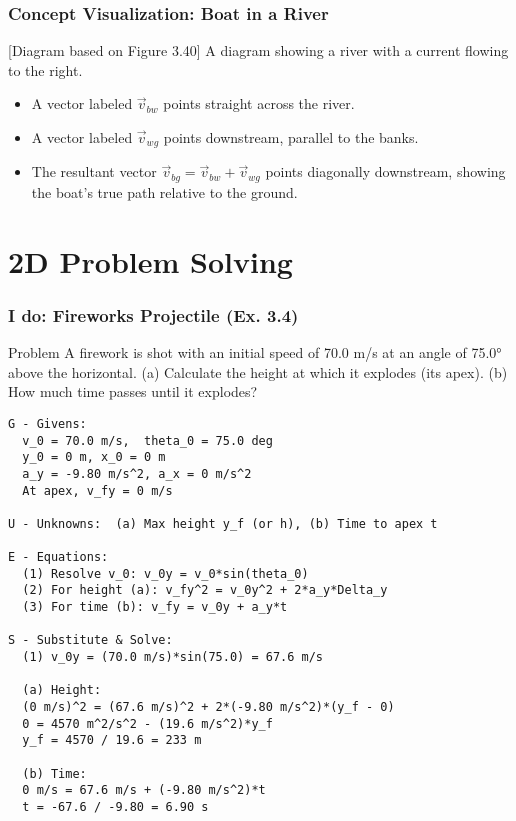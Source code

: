 \documentclass{beamer}
\begin{document}
\begin{frame}
\frametitle{Concept Visualization: Boat in a River}
\begin{alertblock}{[Diagram based on Figure 3.40]}
A diagram showing a river with a current flowing to the right.
\begin{itemize}
    \item A vector labeled $\vec{v}_{bw}$ points straight across the river.
    \item A vector labeled $\vec{v}_{wg}$ points downstream, parallel to the banks.
    \item The resultant vector $\vec{v}_{bg} = \vec{v}_{bw} + \vec{v}_{wg}$ points diagonally downstream, showing the boat's true path relative to the ground.
\end{itemize}
\end{alertblock}
\end{frame}

\section{2D Problem Solving}

\begin{frame}[fragile]
\frametitle{I do: Fireworks Projectile (Ex. 3.4)}
\begin{block}{Problem}
A firework is shot with an initial speed of 70.0 m/s at an angle of 75.0° above the horizontal. (a) Calculate the height at which it explodes (its apex). (b) How much time passes until it explodes?
\end{block}
\pause
\begin{verbatim}
G - Givens:
  v_0 = 70.0 m/s,  theta_0 = 75.0 deg
  y_0 = 0 m, x_0 = 0 m
  a_y = -9.80 m/s^2, a_x = 0 m/s^2
  At apex, v_fy = 0 m/s

U - Unknowns:  (a) Max height y_f (or h), (b) Time to apex t

E - Equations:
  (1) Resolve v_0: v_0y = v_0*sin(theta_0)
  (2) For height (a): v_fy^2 = v_0y^2 + 2*a_y*Delta_y
  (3) For time (b): v_fy = v_0y + a_y*t

S - Substitute & Solve:
  (1) v_0y = (70.0 m/s)*sin(75.0) = 67.6 m/s
  
  (a) Height:
  (0 m/s)^2 = (67.6 m/s)^2 + 2*(-9.80 m/s^2)*(y_f - 0)
  0 = 4570 m^2/s^2 - (19.6 m/s^2)*y_f
  y_f = 4570 / 19.6 = 233 m
  
  (b) Time:
  0 m/s = 67.6 m/s + (-9.80 m/s^2)*t
  t = -67.6 / -9.80 = 6.90 s
\end{verbatim}
\end{frame}
\end{document}

